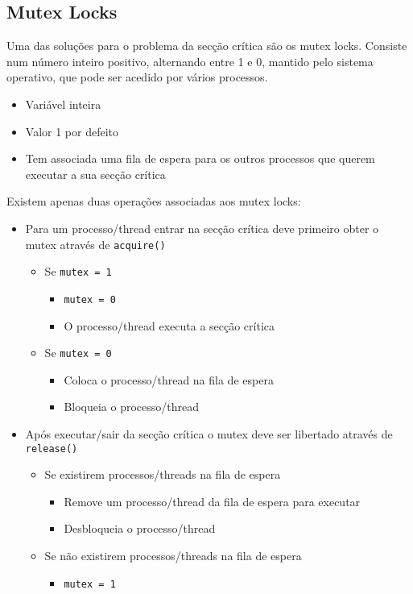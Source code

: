 \documentclass[10pt,a4paper]{report}
\begin{document}
\subsection{Mutex Locks}
Uma das soluções para o problema da secção crítica são os mutex locks. Consiste num número inteiro positivo, alternando entre 1 e 0, mantido pelo sistema operativo, que pode ser acedido por vários processos.
\begin{itemize}
\item Variável inteira
\item Valor 1 por defeito
\item Tem associada uma fila de espera para os outros processos que querem executar a sua secção crítica
\end{itemize}
Existem apenas duas operações associadas aos mutex locks:
\begin{itemize}
\item Para um processo/thread entrar na secção crítica deve primeiro obter o mutex através de \texttt{acquire()} 
\begin{itemize}
\item Se \texttt{mutex = 1}
\begin{itemize}
\item \texttt{mutex = 0}
\item O processo/thread executa a secção crítica
\end{itemize}
\item Se \texttt{mutex = 0}
\begin{itemize}
\item Coloca o processo/thread na fila de espera
\item Bloqueia o processo/thread 
\end{itemize}
\end{itemize}
\item Após executar/sair da secção crítica o mutex deve ser libertado através de \texttt{release()}
\begin{itemize}
\item Se existirem processos/threads na fila de espera
\begin{itemize}
\item Remove um processo/thread da fila de espera para executar
\item Desbloqueia o processo/thread
\end{itemize}
\item Se não existirem processos/threads na fila de espera
\begin{itemize}
\item \texttt{mutex = 1}
\end{itemize}
\end{itemize}
\end{itemize}
\end{document}
